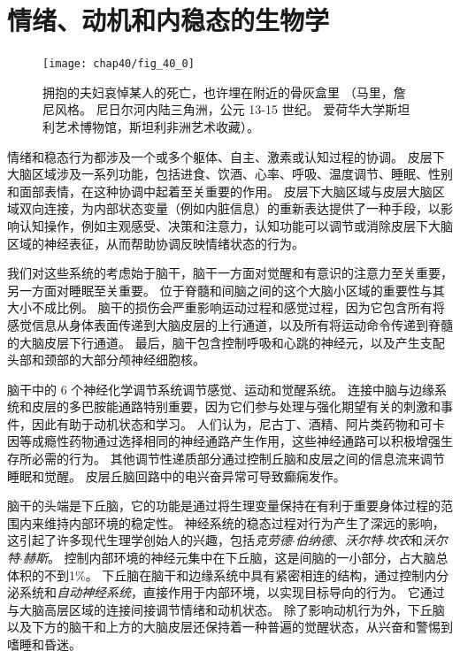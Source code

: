 \part{情绪、动机和内稳态的生物学}

\begin{figure}[htbp]
	\centering
	\texttt{[image: chap40/fig\_40\_0]}
	\caption{拥抱的夫妇哀悼某人的死亡，也许埋在附近的骨灰盒里
		（马里，詹尼风格。
		尼日尔河内陆三角洲，公元 13-15 世纪。
		爱荷华大学斯坦利艺术博物馆，斯坦利非洲艺术收藏）。}
	\label{fig:40_0}
\end{figure}


情绪和稳态行为都涉及一个或多个躯体、自主、激素或认知过程的协调。
皮层下大脑区域涉及一系列功能，包括进食、饮酒、心率、呼吸、温度调节、睡眠、性别和面部表情，在这种协调中起着至关重要的作用。
皮层下大脑区域与皮层大脑区域双向连接，为内部状态变量（例如内脏信息）的重新表达提供了一种手段，以影响认知操作，例如主观感受、决策和注意力，认知功能可以调节或消除皮层下大脑区域的神经表征，从而帮助协调反映情绪状态的行为。



我们对这些系统的考虑始于脑干，脑干一方面对觉醒和有意识的注意力至关重要，另一方面对睡眠至关重要。
位于脊髓和间脑之间的这个大脑小区域的重要性与其大小不成比例。
脑干的损伤会严重影响运动过程和感觉过程，因为它包含所有将感觉信息从身体表面传递到大脑皮层的上行通道，以及所有将运动命令传递到脊髓的大脑皮层下行通道。
最后，脑干包含控制呼吸和心跳的神经元，以及产生支配头部和颈部的大部分颅神经细胞核。


脑干中的 6 个神经化学调节系统调节感觉、运动和觉醒系统。
连接中脑与边缘系统和皮层的多巴胺能通路特别重要，因为它们参与处理与强化期望有关的刺激和事件，因此有助于动机状态和学习。
人们认为，尼古丁、酒精、阿片类药物和可卡因等成瘾性药物通过选择相同的神经通路产生作用，这些神经通路可以积极增强生存所必需的行为。
其他调节性递质部分通过控制丘脑和皮层之间的信息流来调节睡眠和觉醒。
皮层丘脑回路中的电兴奋异常可导致癫痫发作。


脑干的头端是下丘脑，它的功能是通过将生理变量保持在有利于重要身体过程的范围内来维持内部环境的稳定性。
神经系统的稳态过程对行为产生了深远的影响，这引起了许多现代生理学创始人的兴趣，包括\textit{克劳德$\cdot$伯纳德}、\textit{沃尔特$\cdot$坎农}和\textit{沃尔特$\cdot$赫斯}。
控制内部环境的神经元集中在下丘脑，这是间脑的一小部分，占大脑总体积的不到1\%。
下丘脑在脑干和边缘系统中具有紧密相连的结构，通过控制内分泌系统和\textit{自动神经系统}，直接作用于内部环境，以实现目标导向的行为。
它通过与大脑高层区域的连接间接调节情绪和动机状态。
除了影响动机行为外，下丘脑以及下方的脑干和上方的大脑皮层还保持着一种普遍的觉醒状态，从兴奋和警惕到嗜睡和昏迷。


